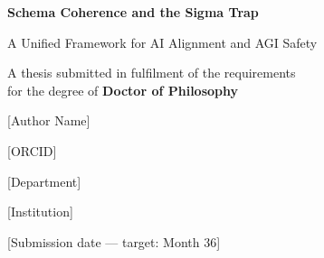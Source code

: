 \begin{titlepage}
\centering
\vspace*{2cm}
{\LARGE\bfseries Schema Coherence and the Sigma Trap\par}
\vspace{0.5cm}
{\Large A Unified Framework for AI Alignment and AGI Safety\par}
\vspace{2cm}
{\large A thesis submitted in fulfilment of the requirements\\ for the degree of \textbf{Doctor of Philosophy}\par}
\vspace{1cm}
{\large [Author Name]\par}
\vspace{0.3cm}
{\large [ORCID]\par}
\vspace{1cm}
{\large [Department]\par}
{\large [Institution]\par}
\vspace{2cm}
{\large [Submission date — target: Month 36]\par}
\vfill
\end{titlepage}

